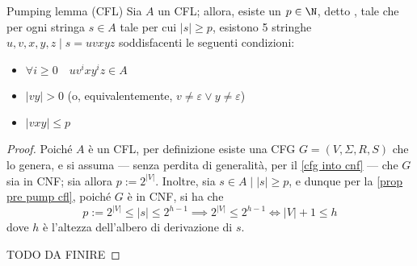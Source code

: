 \documentclass[a4paper, 12pt]{report}
\begin{document}
    \begin{framedlem}[label={pump cfl}]{Pumping lemma (CFL)}
        Sia $A$ un CFL; allora, esiste un $p \in \N$, detto , tale che per ogni stringa $s \in A$ tale per cui $|s| \ge p$, esistono 5 stringhe $u, v, x, y, z \mid s = uvxyz$ soddisfacenti le seguenti condizioni:

        \begin{itemize}
            \item $\forall i \ge 0 \quad uv^ixy^iz \in A$
            \item $|vy| > 0$ (o, equivalentemente, $v \neq \varepsilon \lor y \neq \varepsilon$)
            \item $|vxy| \le p$
        \end{itemize}
    \end{framedlem}

    \begin{proof}
        Poiché $A$ è un CFL, per definizione esiste una CFG $G = (V, \Sigma, R, S)$ che lo genera, e si assuma --- senza perdita di generalità, per il \cref{cfg into cnf} --- che $G$ sia in CNF; sia allora $p := 2^{|V|}$. Inoltre, sia $s \in A \mid |s| \ge p$, e dunque per la \cref{prop pre pump cfl}, poiché $G$ è in CNF, si ha che $$p := 2^{|V|} \le |s| \le 2^{h - 1} \implies 2^{|V|} \le 2^{h - 1} \iff |V| + 1 \le h$$ dove $h$ è l'altezza dell'albero di derivazione di $s$.

        TODO DA FINIRE
    \end{proof}
\end{document}
